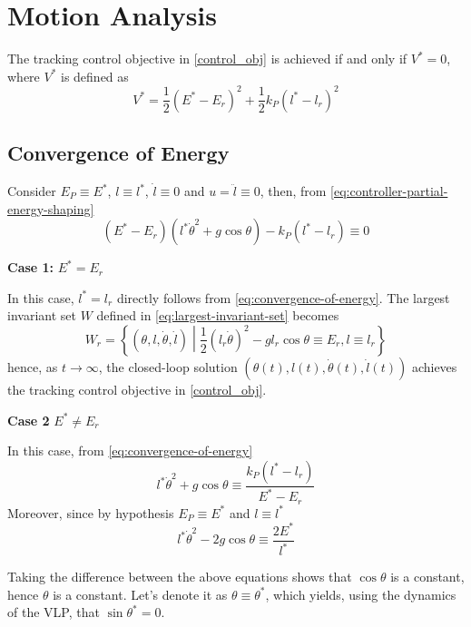 \documentclass[main.tex]{subfiles}
\begin{document}
\section{Motion Analysis}
\label{sec:motion-analysis}
The tracking control objective in \eqref{control_obj} is 
achieved if and only if $V^* = 0$, where $V^*$ is defined as
\begin{equation}
  V^* = \frac{1}{2}(E^*-E_r)^2+\frac{1}{2}k_P(l^*-l_r)^2
\end{equation}
\subsection{Convergence of Energy}
\label{subsec:convergence-of-energy}
Consider $E_P \equiv E^*$, $l \equiv l^*$, $\dot{l} \equiv 0$ and $u = \ddot{l} \equiv 0$, then, from
\eqref{eq:controller-partial-energy-shaping}
\begin{equation}
  \label{eq:convergence-of-energy}
  (E^*-E_r)(l^*\dot{\theta}^2+g\cos\theta)-k_P(l^*-l_r) \equiv 0
\end{equation}

\noindent \textbf{Case 1:} $E^* = E_r$

In this case, $l^* = l_r$ directly follows from 
\eqref{eq:convergence-of-energy}. The largest invariant set $W$
defined in \eqref{eq:largest-invariant-set} becomes
\begin{equation}
  \label{eq:def-Wr}
  W_r = \left\{ (\theta, l, \dot{\theta}, \dot{l})
    \middle| \frac{1}{2} (l_r \dot{\theta})^2 -
    g l_r \cos\theta \equiv E_r, l \equiv l_r \right\}
\end{equation}
hence, as $t \to \infty$, the closed-loop solution
$(\theta(t), l(t), \dot{\theta}(t), \dot{l}(t))$ achieves the
tracking control objective in \eqref{control_obj}.

\noindent \textbf{Case 2} $E^* \neq E_r$

In this case, from \eqref{eq:convergence-of-energy}
\begin{equation}
  l^* \dot{\theta}^2 + g\cos\theta \equiv 
  \frac{k_P(l^*-l_r)}{E^*-E_r}
\end{equation}
Moreover, since by hypothesis $E_P \equiv E^*$ and $l 
\equiv l^*$
\begin{equation}
  l^* \dot{\theta}^2 - 2g\cos\theta \equiv \frac{2E^*}{l^*}
\end{equation}

Taking the difference between the above equations shows that
$\cos\theta$ is a constant, hence $\theta$ is a constant.
Let's denote it as $\theta \equiv \theta^*$, which yields, using the dynamics 
of the VLP, that
$\sin\theta^*=0$.
\end{document}
